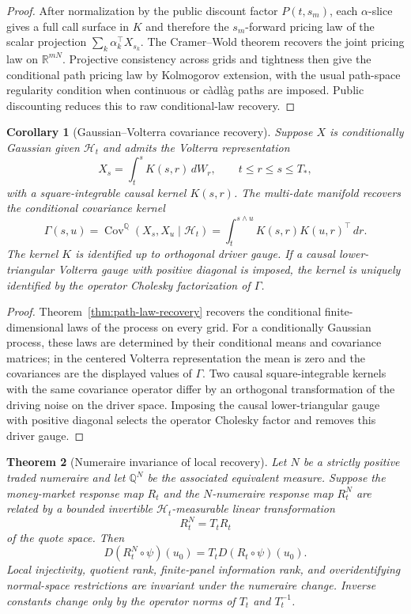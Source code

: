 \documentclass[11pt,a4paper]{amsart}
\theoremstyle{plain}
\newtheorem{theorem}{Theorem}[section]
\newtheorem{corollary}[theorem]{Corollary}
\theoremstyle{definition}
\theoremstyle{remark}
\DeclareMathOperator{\Cov}{Cov}
\newcommand{\R}{\mathbb{R}}
\newcommand{\QQ}{\mathbb{Q}}
\newcommand{\cH}{\mathcal{H}}
\newcommand{\dd}{\,d}
\begin{document}
\begin{proof}
After normalization by the public discount factor \(P(t,s_m)\), each \(\alpha\)-slice gives a
full call surface in \(K\) and therefore the \(s_m\)-forward pricing law of the scalar projection
\(\sum_k\alpha_k^\top X_{s_k}\).  The Cramer--Wold theorem recovers the joint pricing law on
\(\R^{mN}\).  Projective consistency across grids and tightness then give the conditional path
pricing law by Kolmogorov extension, with the usual path-space regularity condition when
continuous or c\`adl\`ag paths are imposed.  Public discounting reduces this to raw
conditional-law recovery.
\end{proof}

\begin{corollary}[Gaussian--Volterra covariance recovery]\label{cor:gv-path-covariance-recovery}
Suppose \(X\) is conditionally Gaussian given \(\cH_t\) and admits the Volterra representation
\[
        X_s=\int_t^s K(s,r)\dd W_r,\qquad t\le r\le s\le T_\ast,
\]
with a square-integrable causal kernel \(K(s,r)\).  The multi-date manifold recovers the
conditional covariance kernel
\[
        \Gamma(s,u)
        =
        \Cov^\QQ(X_s,X_u\mid\cH_t)
        =
        \int_t^{s\wedge u}K(s,r)K(u,r)^\top\dd r .
\]
The kernel \(K\) is identified up to orthogonal driver gauge.  If a causal lower-triangular
Volterra gauge with positive diagonal is imposed, the kernel is uniquely identified by the
operator Cholesky factorization of \(\Gamma\).
\end{corollary}

\begin{proof}
Theorem~\ref{thm:path-law-recovery} recovers the conditional finite-dimensional laws of the process
on every grid.  For a conditionally Gaussian process, these laws are determined by their conditional
means and covariance matrices; in the centered Volterra representation the mean is zero and the
covariances are the displayed values of \(\Gamma\).  Two causal square-integrable kernels with the
same covariance operator differ by an orthogonal transformation of the driving noise on the driver
space.  Imposing the causal lower-triangular gauge with positive diagonal selects the operator
Cholesky factor and removes this driver gauge.
\end{proof}


\begin{theorem}[Numeraire invariance of local recovery]\label{thm:numeraire-invariance}
Let \(N\) be a strictly positive traded numeraire and let \(\QQ^N\) be the associated equivalent
measure.  Suppose the money-market response map \(R_t\) and the \(N\)-numeraire response map
\(R_t^N\) are related by a bounded invertible \(\cH_t\)-measurable linear transformation
\[
        R_t^N=T_tR_t
\]
of the quote space.  Then
\[
        D(R_t^N\circ\psi)(u_0)=T_tD(R_t\circ\psi)(u_0).
\]
Local injectivity, quotient rank, finite-panel information rank, and overidentifying normal-space
restrictions are invariant under the numeraire change.  Inverse constants change only by the
operator norms of \(T_t\) and \(T_t^{-1}\).
\end{theorem}
\end{document}
